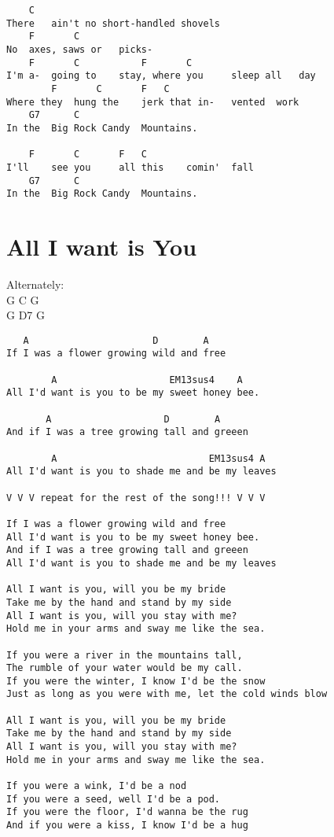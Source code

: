 \documentclass[leqno]{memoir}
\begin{document}
\newpage
\begin{verbatim}
    C
There   ain't no short-handled shovels
    F       C
No  axes, saws or   picks-
    F       C           F       C
I'm a-  going to    stay, where you     sleep all   day
        F       C       F   C
Where they  hung the    jerk that in-   vented  work
    G7      C
In the  Big Rock Candy  Mountains.

    F       C       F   C
I'll    see you     all this    comin'  fall
    G7      C
In the  Big Rock Candy  Mountains.
\end{verbatim}
\newpage

\chapter{All I want is You}
Alternately:\\
G C G\\
G D7 G
\begin{verbatim}
   A                      D        A
If I was a flower growing wild and free

        A                    EM13sus4    A
All I'd want is you to be my sweet honey bee.

       A                    D        A
And if I was a tree growing tall and greeen

        A                           EM13sus4 A
All I'd want is you to shade me and be my leaves

V V V repeat for the rest of the song!!! V V V

If I was a flower growing wild and free
All I'd want is you to be my sweet honey bee.
And if I was a tree growing tall and greeen
All I'd want is you to shade me and be my leaves

All I want is you, will you be my bride
Take me by the hand and stand by my side
All I want is you, will you stay with me?
Hold me in your arms and sway me like the sea.

If you were a river in the mountains tall,
The rumble of your water would be my call.
If you were the winter, I know I'd be the snow
Just as long as you were with me, let the cold winds blow

All I want is you, will you be my bride
Take me by the hand and stand by my side
All I want is you, will you stay with me?
Hold me in your arms and sway me like the sea.

If you were a wink, I'd be a nod
If you were a seed, well I'd be a pod.
If you were the floor, I'd wanna be the rug
And if you were a kiss, I know I'd be a hug
\end{verbatim}
\end{document}

